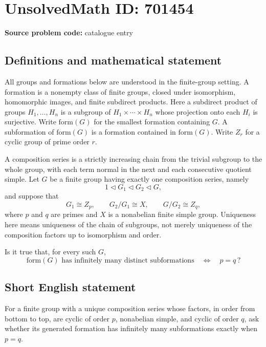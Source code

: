\documentclass[11pt]{article}
\begin{document}
\section*{UnsolvedMath ID: 701454}
\textbf{Source problem code:} catalogue entry
\subsection{Definitions and mathematical statement}
All groups and formations below are understood in the finite-group setting. A formation is a nonempty class of finite groups, closed under isomorphism, homomorphic images, and finite subdirect products. Here a subdirect product of groups \(H_1,\ldots,H_n\) is a subgroup of \(H_1\times\cdots\times H_n\) whose projection onto each \(H_i\) is surjective. Write \(\mathrm{form}(G)\) for the smallest formation containing \(G\). A subformation of \(\mathrm{form}(G)\) is a formation contained in \(\mathrm{form}(G)\). Write \(Z_r\) for a cyclic group of prime order \(r\).

A composition series is a strictly increasing chain from the trivial subgroup to the whole group, with each term normal in the next and each consecutive quotient simple. Let \(G\) be a finite group having exactly one composition series, namely
\[
1\triangleleft G_1\triangleleft G_2\triangleleft G,
\]
and suppose that
\[
G_1\cong Z_p,\qquad G_2/G_1\cong X,\qquad G/G_2\cong Z_q,
\]
where \(p\) and \(q\) are primes and \(X\) is a nonabelian finite simple group. Uniqueness here means uniqueness of the chain of subgroups, not merely uniqueness of the composition factors up to isomorphism and order.

Is it true that, for every such \(G\),
\[
\mathrm{form}(G)\text{ has infinitely many distinct subformations}
\quad\Longleftrightarrow\quad p=q\,?
\]
\subsection{Short English statement}
For a finite group with a unique composition series whose factors, in order from bottom to top, are cyclic of order \(p\), nonabelian simple, and cyclic of order \(q\), ask whether its generated formation has infinitely many subformations exactly when \(p=q\).
\end{document}
